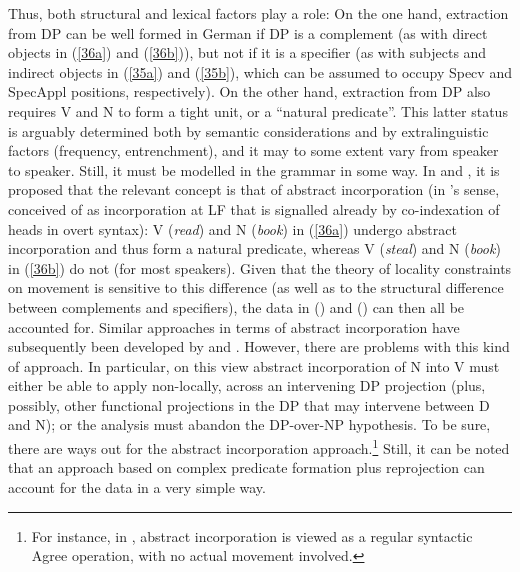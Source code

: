 \documentclass[output=paper
,modfonts
,nonflat]{langsci/langscibook}
\begin{document}
	\ea\label{ex:mueller:38}
	\z
	\z
	Thus, both structural and lexical factors play a role: On the one
	hand, extraction from DP can be well formed in German if DP is a complement
	(as with direct objects in (\ref{36a}) and (\ref{36b})), but not if it is a specifier (as with subjects and indirect objects in (\ref{35a}) and (\ref{35b}), which can be assumed
	to occupy Specv and SpecAppl positions, respectively). On the other
	hand, extraction from DP also requires V and N to form a tight unit,
	or a ``natural predicate''. This latter status is arguably determined
	both by semantic considerations and by extralinguistic factors
	(frequency, entrenchment), and it may to some extent vary from speaker
	to speaker. Still, it must be modelled in the grammar in some way. In
	\citet{Mueller:91:abs} and \citet{MuellerSternefeld:95}, it is proposed
	that the relevant concept is that of abstract incorporation (in
	\citealt{Baker:88}'s sense, conceived of as incorporation at LF that
	is signalled already by co-indexation of heads in overt syntax): V
	(\textit{read}) and N (\textit{book}) in (\ref{36a}) undergo abstract
	incorporation and thus form a natural predicate, whereas V (\textit{steal}) 
	and N (\textit{book}) in (\ref{36b}) do not (for most speakers). Given that
	the theory of locality constraints on movement is sensitive to this
	difference (as well as to the structural difference between
	complements and specifiers), the data in (\LLast) and (\Last) can then all
	be accounted for. Similar approaches in terms of abstract
	incorporation have subsequently been developed by
	\citet{DaviesDubinsky:03} and \citet{Schmellentin:06}. However, there
	are problems with this kind of approach. In particular, on this view
	abstract incorporation of N into V must either be able to apply
	non-locally, across an intervening DP projection (plus, possibly,
	other functional projections in the DP that may intervene between D
	and N); or the analysis must abandon the DP-over-NP hypothesis. To be
	sure, there are ways out for the abstract incorporation
	approach.\footnote{For instance, in \citet{Mueller:11:loc}, abstract incorporation is
		viewed as a regular syntactic Agree operation, with no actual
		movement involved.} Still, it can be noted that an approach based on
	complex predicate formation plus reprojection can account for the data
	in a very simple way. 
	
\end{document}
